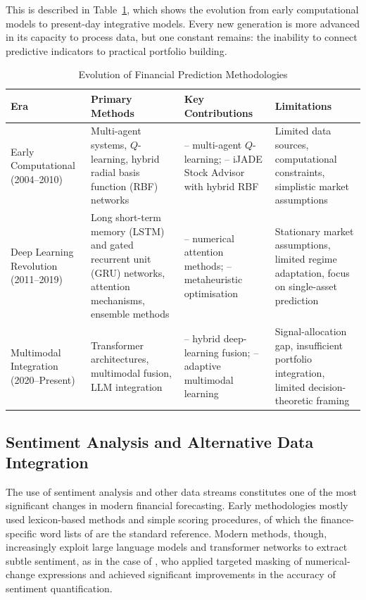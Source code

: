 \documentclass{singlecol-new}
\theoremstyle{TH}{
\newtheorem{lemma}{Lemma}
\newtheorem{theorem}[lemma]{Theorem}
\newtheorem{corrolary}[lemma]{Corrolary}
\newtheorem{conjecture}[lemma]{Conjecture}
\newtheorem{proposition}[lemma]{Proposition}
\newtheorem{claim}[lemma]{Claim}
\newtheorem{stheorem}[lemma]{Wrong Theorem}
\newtheorem{algorithm}{Algorithm}
}
\theoremstyle{THrm}{
\newtheorem{definition}{Definition}[section]
\newtheorem{question}{Question}[section]
\newtheorem{remark}{Remark}
\newtheorem{scheme}{Scheme}
}
\theoremstyle{THhit}{
\newtheorem{case}{Case}[section]
}
\begin{document}
This is described in Table~\ref{tab:evolution}, which shows the evolution from early
computational models to present-day integrative models. Every new generation is more
advanced in its capacity to process data, but one constant remains: the inability to
connect predictive indicators to practical portfolio building.

\begin{table}[!ht]
\centering
\caption{Evolution of Financial Prediction Methodologies}
\label{tab:evolution}
\footnotesize
\begin{tabular}{p{2.5cm}p{2.5cm}p{2.5cm}p{2.5cm}}
\hline
\textbf{Era} & \textbf{Primary Methods} & \textbf{Key Contributions} & \textbf{Limitations} \\
\hline
Early Computational (2004--2010) & Multi-agent systems, $Q$-learning, hybrid radial basis function (RBF) networks & \citet{lee07} -- multi-agent $Q$-learning; \citet{lee04} -- iJADE Stock Advisor with hybrid RBF & Limited data sources, computational constraints, simplistic market assumptions \\
\hline
Deep Learning Revolution (2011--2019) & Long short-term memory (LSTM) and gated recurrent unit (GRU) networks, attention mechanisms, ensemble methods & \citet{liu19} -- numerical attention methods; \citet{chou18} -- metaheuristic optimisation & Stationary market assumptions, limited regime adaptation, focus on single-asset prediction \\
\hline
Multimodal Integration (2020--Present) & Transformer architectures, multimodal fusion, LLM integration & \citet{moodi24} -- hybrid deep-learning fusion; \citet{farimani24} -- adaptive multimodal learning & Signal-allocation gap, insufficient portfolio integration, limited decision-theoretic framing \\
\hline
\end{tabular}
\end{table}

\subsection{Sentiment Analysis and Alternative Data Integration}

The use of sentiment analysis and other data streams constitutes one of the most
significant changes in modern financial forecasting. Early methodologies mostly used
lexicon-based methods and simple scoring procedures, of which the finance-specific word
lists of \citet{loughran11} are the standard reference. Modern methods, though,
increasingly exploit large language models and transformer networks to extract subtle
sentiment, as in the case of \citet{jung24}, who applied targeted masking of
numerical-change expressions and achieved significant improvements in the accuracy of
sentiment quantification.
\end{document}
